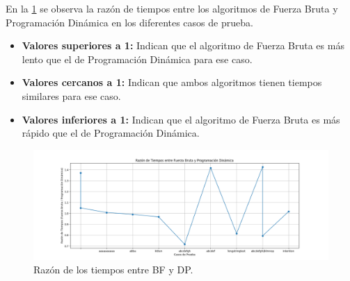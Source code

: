 \noindent En la \cref{ratios} se observa la razón de tiempos entre los algoritmos de Fuerza Bruta y Programación Dinámica en los diferentes casos de prueba.

\begin{itemize}
    \item \textbf{Valores superiores a 1:} Indican que el algoritmo de Fuerza Bruta es más lento que el de Programación Dinámica para ese caso.
    
    \item \textbf{Valores cercanos a 1:} Indican que ambos algoritmos tienen tiempos similares para ese caso.
    
    \item \textbf{Valores inferiores a 1:} Indican que el algoritmo de Fuerza Bruta es más rápido que el de Programación Dinámica.
\end{itemize}

\begin{figure}[H]
    \centering
    \includegraphics[width=\textwidth]{images/speedup_ratio.png}
    \caption{Razón de los tiempos entre BF y DP.}
    \label{ratios}
\end{figure}
